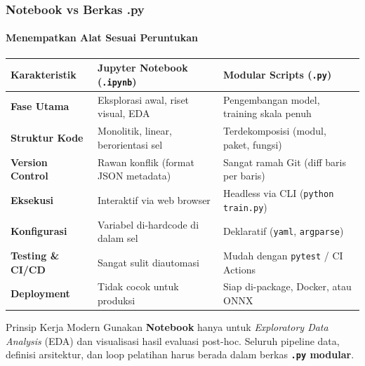 \documentclass[t,aspectratio=169,xcolor=dvipsnames]{beamer}
\begin{document}
\begin{frame}
  \frametitle{Notebook vs Berkas .py}
  \framesubtitle{Menempatkan Alat Sesuai Peruntukan}

  \centering
  \scriptsize
  \begin{tabular}{lll}
    \toprule
    \textbf{Karakteristik} & \textbf{Jupyter Notebook (\texttt{.ipynb})} & \textbf{Modular Scripts (\texttt{.py})} \\
    \midrule
    \textbf{Fase Utama} & Eksplorasi awal, riset visual, EDA & Pengembangan model, training skala penuh \\
    \textbf{Struktur Kode} & Monolitik, linear, berorientasi sel & Terdekomposisi (modul, paket, fungsi) \\
    \textbf{Version Control} & Rawan konflik (format JSON metadata) & Sangat ramah Git (diff baris per baris) \\
    \textbf{Eksekusi} & Interaktif via web browser & Headless via CLI (\texttt{python train.py}) \\
    \textbf{Konfigurasi} & Variabel di-hardcode di dalam sel & Deklaratif (\texttt{yaml}, \texttt{argparse}) \\
    \textbf{Testing \& CI/CD} & Sangat sulit diautomasi & Mudah dengan \texttt{pytest} / CI Actions \\
    \textbf{Deployment} & Tidak cocok untuk produksi & Siap di-package, Docker, atau ONNX \\
    \bottomrule
  \end{tabular}

  \vspace{0.3cm}
  \begin{exampleblock}{Prinsip Kerja Modern}
    Gunakan \textbf{Notebook} hanya untuk \textit{Exploratory Data Analysis} (EDA) dan visualisasi hasil evaluasi post-hoc. Seluruh pipeline data, definisi arsitektur, dan loop pelatihan harus berada dalam berkas \textbf{\texttt{.py} modular}.
  \end{exampleblock}
\end{frame}
\end{document}

